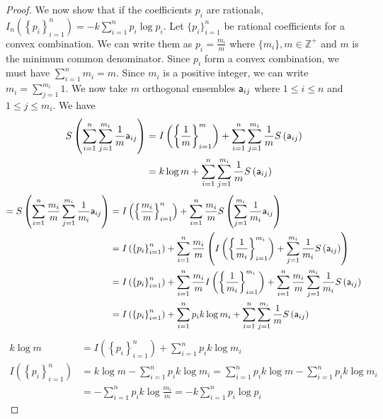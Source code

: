 \begin{proof}
	We now show that if the coefficients $p_i$ are rationals, $I_n\left(\left\{ p_i\right\}_{i=1}^{n}\right) = - k \sum_{i=1}^{n} p_i \log p_i$. Let $\{p_i\}_{i=1}^{n}$ be rational coefficients for a convex combination. We can write them as $p_i = \frac{m_i}{m}$ where $\{m_i\}, m \in \mathbb{Z}^+$ and $m$ is the minimum common denominator. Since $p_i$ form a convex combination, we must have $\sum_{i=1}^{n} m_i = m$. Since $m_i$ is a positive integer, we can write $m_i = \sum_{j=1}^{m_i} 1$. We now take $m$ orthogonal ensembles $\ens[a]_{ij}$ where $1 \leq i \leq n$ and $1 \leq j \leq m_i$. We have
	\begin{equation}
	\begin{aligned}
		S\left(\sum_{i=1}^{n}\sum_{j=1}^{m_i} \frac{1}{m} \ens[a]_{ij}\right) &= I\left(\left\{ \frac{1}{m}\right\}_{i=1}^{m}\right) + \sum_{i=1}^{n}\sum_{j=1}^{m_i} \frac{1}{m} S\left(\ens[a]_{ij}\right) \\
		&= k \log m + \sum_{i=1}^{n}\sum_{j=1}^{m_i} \frac{1}{m} S\left(\ens[a]_{ij}\right) \\
	\end{aligned}
	\end{equation}
	\begin{equation}
	\begin{aligned}
	= S\left(\sum_{i=1}^{n} \frac{m_i}{m} \sum_{j=1}^{m_i} \frac{1}{m_i} \ens[a]_{ij}\right)  &=I\left(\left\{ \frac{m_i}{m}\right\}_{i=1}^{n}\right) + \sum_{i=1}^{n} \frac{m_i}{m}  S\left(\sum_{j=1}^{m_i} \frac{1}{m_i} \ens[a]_{ij}\right) \\
		&=I\left(\left\{ p_i\right\}_{i=1}^{n}\right) + \sum_{i=1}^{n} \frac{m_i}{m}\left(I\left(\left\{ \frac{1}{m_i}\right\}_{i=1}^{m_i}\right) + \sum_{j=1}^{m_i} \frac{1}{m_i} S\left(\ens[a]_{ij}\right)\right) \\
		&=I\left(\left\{ p_i\right\}_{i=1}^{n}\right) + \sum_{i=1}^{n} \frac{m_i}{m} I\left(\left\{ \frac{1}{m_i}\right\}_{i=1}^{m_i}\right) + \sum_{i=1}^{n} \frac{m_i}{m} \sum_{j=1}^{m_i} \frac{1}{m_i}S\left(\ens[a]_{ij}\right) \\
		&=I\left(\left\{ p_i\right\}_{i=1}^{n}\right) + \sum_{i=1}^{n} p_i k \log m_i + \sum_{i=1}^{n}  \sum_{j=1}^{m_i} \frac{1}{m} S\left(\ens[a]_{ij}\right)
	\end{aligned}
	\end{equation}
	\begin{equation}
	\begin{aligned}
		k \log m &= I\left(\left\{ p_i\right\}_{i=1}^{n}\right) + \sum_{i=1}^{n} p_i k \log m_i \\
		I\left(\left\{ p_i\right\}_{i=1}^{n}\right) &= k \log m - \sum_{i=1}^{n} p_i k \log m_i = \sum_{i=1}^{n} p_i k \log m - \sum_{i=1}^{n} p_i k \log m_i \\
		&= - \sum_{i=1}^{n} p_i k \log \frac{m_i}{m} = - k \sum_{i=1}^{n} p_i \log p_i
	\end{aligned}
	\end{equation}
	

\end{proof}
